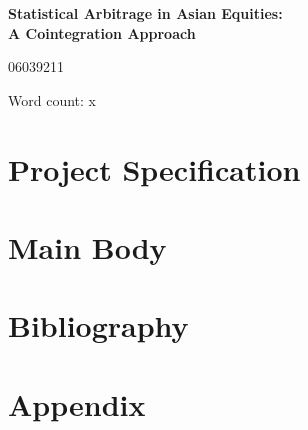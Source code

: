 \documentclass[a4paper, 10pt]{article}
\renewcommand{\thefootnote}{\fnsymbol{footnote}}
\begin{document}
\renewcommand{\thefootnote}{\arabic{footnote}}
\begin{titlepage}
    \centering
    \vspace*{\fill}
    {\Large\bfseries Statistical Arbitrage in Asian Equities:\\ A Cointegration Approach}\\
    \vspace{1.5cm}
    {\Large 06039211\par}
    \vspace{7cm}
    {\Large Word count: x \par}
    \vspace*{\fill}
\end{titlepage}
\section*{Project Specification}

\clearpage

\tableofcontents 
\clearpage

\section{Main Body}

\section{Bibliography}

\section{Appendix}
\end{document}
